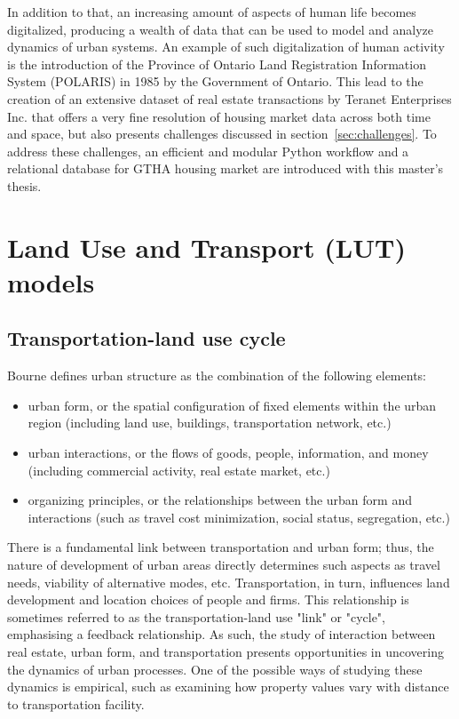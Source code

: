 In addition to that, an increasing amount of aspects of human life becomes digitalized, producing a wealth of data that can be used to model and analyze dynamics of urban systems\cite{Arribas-Bel2014, Chen2016}.
An example of such digitalization of human activity is the introduction of the Province of Ontario Land Registration Information System (POLARIS) in 1985 by the Government of Ontario\cite{TeranetEnterprisesInc.}.
This lead to the creation of an extensive dataset of real estate transactions by Teranet Enterprises Inc.
that offers a very fine resolution of housing market data across both time and space, but also presents challenges discussed in section~\ref{sec:challenges}.
To address these challenges, an efficient and modular Python workflow and a relational database for GTHA housing market are introduced with this master's thesis.

\section{Land Use and Transport (LUT) models} \label{sec:evolution_of_models_of_urban_systems}

\subsection{Transportation-land use cycle} \label{subsec:transportation_urban_form_real_estate_data}

Bourne\cite{Bourne1982} defines urban structure as the combination of the following elements:
\begin{itemize}
    \item urban form, or the spatial configuration of fixed elements within the urban region (including land use, buildings, transportation network, etc.)
    \item urban interactions, or the flows of goods, people, information, and money (including commercial activity, real estate market, etc.)
    \item organizing principles, or the relationships between the urban form and interactions (such as travel cost minimization, social status, segregation, etc.)
\end{itemize}
There is a fundamental link between transportation and urban form;
thus, the nature of development of urban areas directly determines such aspects as travel needs, viability of alternative modes, etc.
Transportation, in turn, influences land development and location choices of people and firms\cite{Miller1999}.
This relationship is sometimes referred to as the transportation-land use "link" or "cycle", emphasising a feedback relationship\cite{Kelly}.
As such, the study of interaction between real estate, urban form, and transportation presents opportunities in uncovering the dynamics of urban processes.
One of the possible ways of studying these dynamics is empirical, such as examining how property values vary with distance to transportation facility\cite{Sherry1999}.

